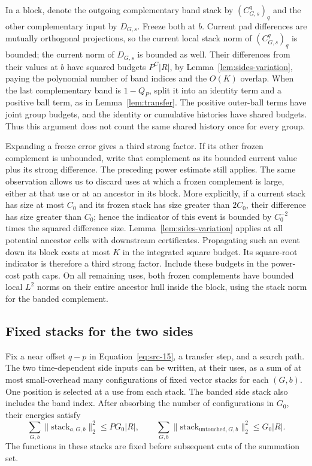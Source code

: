 In a block, denote the outgoing complementary band stack by
$(C_{G,s}^q)_q$ and the other complementary input by $D_{G,s}$.
Freeze both at $b$.  Current pad differences are mutually orthogonal
projections, so the current local stack norm of $(C_{G,s}^q)_q$ is
bounded; the current norm of $D_{G,s}$ is bounded as well.  Their
differences from their values at $b$ have squared budgets $P^C|R|$,
by Lemma~\ref{lem:sides-variation}, paying the polynomial number of
band indices and the $O(K)$ overlap.  When the last complementary
band is $1-Q_P$, split it into an identity term and a positive ball
term, as in Lemma~\ref{lem:transfer}.  The positive outer-ball
terms have joint group budgets, and the identity or cumulative
histories have shared budgets.  Thus this argument does not count
the same shared history once for every group.

Expanding a freeze error gives a third strong factor.  If its other
frozen complement is unbounded, write that complement as its bounded
current value plus its strong difference.  The preceding power
estimate still applies.  The same observation allows us to discard
uses at which a frozen complement is large, either at that use or
at an ancestor in its block.  More explicitly, if a current stack
has size at most $C_0$ and its frozen stack has size greater than
$2C_0$, their difference has size greater than $C_0$; hence the
indicator of this event is bounded by $C_0^{-2}$ times the squared
difference size.  Lemma~\ref{lem:sides-variation} applies at all
potential ancestor cells with downstream certificates.  Propagating
such an event down its block costs at most $K$ in the integrated
square budget.  Its square-root indicator is therefore a third
strong factor.  Include these budgets in the power-cost path caps.
On all remaining uses, both frozen complements have bounded local
$L^2$ norms on their entire ancestor hull inside the block, using
the stack norm for the banded complement.

\subsection{Fixed stacks for the two sides}

\begin{lemma}\label{lem:sides-stacks}
Fix a near offset $q-p$ in Equation~\eqref{eq:src-15}, a transfer
step, and a search path.  The two time-dependent side inputs can be
written, at their uses, as a sum of at most small-overhead many
configurations of fixed vector stacks for each $(G,b)$.  One
position is selected at a use from each stack.  The banded side
stack also includes the band index.  After absorbing the number of
configurations in $G_0$, their energies satisfy
\[
 \sum_{G,b}\|\mathrm{stack}_{a,G,b}\|_2^2
       \le P G_0|R|,
 \qquad
 \sum_{G,b}\|\mathrm{stack}_{\mathrm{untouched},G,b}\|_2^2
       \le G_0|R|.
 \tag{18}\label{eq:src-18}
\]
The functions in these stacks are fixed before subsequent cuts of
the summation set.
\end{lemma}

